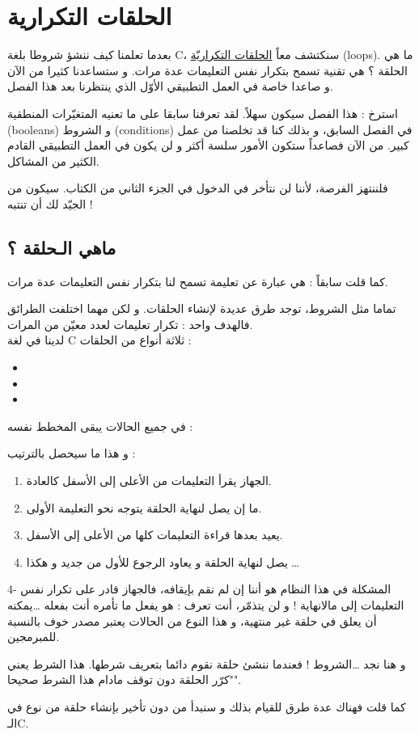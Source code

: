 \chapter{الحلقات التكرارية}

بعدما تعلمنا كيف ننشؤ شروطا بلغة 
\textenglish{C}،
سنكتشف معاً 
\underline{الحلقات التكراريّة} (\textenglish{loops}).
ما هي الحلقة ؟ هي تقنية تسمح بتكرار نفس التعليمات عدة مرات. و ستساعدنا كثيرا من الآن و صاعدا خاصة في العمل التطبيقي الأوّل الذي ينتظرنا بعد هذا الفصل.

استرخ : هذا الفصل سيكون سهلاً. لقد تعرفنا سابقا على ما تعنيه المتغيّرات المنطقية
(\textenglish{booleans})
و الشروط 
(\textenglish{conditions})
في الفصل السابق، و بذلك كنا قد تخلصنا من عمل كبير. من الآن فصاعداً ستكون الأمور سلسة أكثر و لن يكون في العمل التطبيقي القادم الكثير من المشاكل.

فلننتهز الفرصة، لأننا لن نتأخر في الدخول في الجزء الثاني من الكتاب. سيكون من الجيّد لك أن تنتبه !

\section{ماهي الـحلقة ؟}

كما قلت سابقاً : هي عبارة عن تعليمة تسمح لنا بتكرار نفس التعليمات عدة مرات. 

تماما مثل الشروط، توجد طرق عديدة لإنشاء الحلقات. و لكن مهما اختلفت الطرائق فالهدف واحد : تكرار تعليمات لعدد معيّن من المرات. \\
لدينا في لغة 
\textenglish{C}
ثلاثة أنواع من الحلقات :
\begin{itemize}
	\item {}
	\item {}
	\item {}
\end{itemize}
في جميع الحالات يبقى المخطط نفسه :

و هذا ما سيحصل بالترتيب :

\begin{enumerate}
	\item الجهاز يقرأ التعليمات من الأعلى إلى الأسفل كالعادة.
	\item ما إن يصل لنهاية الحلقة يتوجه نحو التعليمة الأولى.
	\item يعيد بعدها قراءة التعليمات كلها من الأعلى إلى الأسفل.
	\item يصل لنهاية الحلقة و يعاود الرجوع للأول من جديد و هكذا \dots
\end{enumerate}
4- 
المشكلة في هذا النظام هو أننا إن لم نقم بإيقافه، فالجهاز قادر على تكرار نفس التعليمات إلى مالانهاية ! و لن يتذمّر، أنت تعرف : هو يفعل ما تأمره أنت بفعله \dots يمكنه أن يعلق في حلقة غير منتهية، و هذا النوع من الحالات يعتبر مصدر خوف  بالنسبة للمبرمجين.

و هنا نجد \dots الشروط ! فعندما ننشئ حلقة نقوم دائما بتعريف شرطها. هذا الشرط يعني "كرّر الحلقة دون توقف مادام هذا الشرط صحيحا".

كما قلت فهناك عدة طرق للقيام بذلك و سنبدأ من دون تأخير بإنشاء حلقة من نوع 
في الـ\textenglish{C}.
